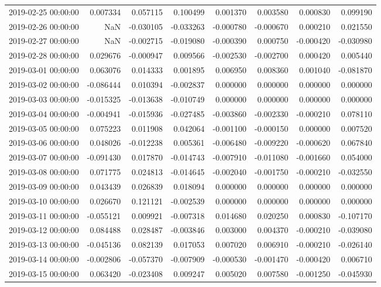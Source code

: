 \begin{tabular}{lrrrrrrr}
2019-02-25 00:00:00 & 0.007334 & 0.057115 & 0.100499 & 0.001370 & 0.003580 & 0.000830 & 0.099190 \\
2019-02-26 00:00:00 & NaN & -0.030105 & -0.033263 & -0.000780 & -0.000670 & 0.000210 & 0.021550 \\
2019-02-27 00:00:00 & NaN & -0.002715 & -0.019080 & -0.000390 & 0.000750 & -0.000420 & -0.030980 \\
2019-02-28 00:00:00 & 0.029676 & -0.000947 & 0.009566 & -0.002530 & -0.002700 & 0.000420 & 0.005440 \\
2019-03-01 00:00:00 & 0.063076 & 0.014333 & 0.001895 & 0.006950 & 0.008360 & 0.001040 & -0.081870 \\
2019-03-02 00:00:00 & -0.086444 & 0.010394 & -0.002837 & 0.000000 & 0.000000 & 0.000000 & 0.000000 \\
2019-03-03 00:00:00 & -0.015325 & -0.013638 & -0.010749 & 0.000000 & 0.000000 & 0.000000 & 0.000000 \\
2019-03-04 00:00:00 & -0.004941 & -0.015936 & -0.027485 & -0.003860 & -0.002330 & -0.000210 & 0.078110 \\
2019-03-05 00:00:00 & 0.075223 & 0.011908 & 0.042064 & -0.001100 & -0.000150 & 0.000000 & 0.007520 \\
2019-03-06 00:00:00 & 0.048026 & -0.012238 & 0.005361 & -0.006480 & -0.009220 & -0.000620 & 0.067840 \\
2019-03-07 00:00:00 & -0.091430 & 0.017870 & -0.014743 & -0.007910 & -0.011080 & -0.001660 & 0.054000 \\
2019-03-08 00:00:00 & 0.071775 & 0.024813 & -0.014645 & -0.002040 & -0.001750 & -0.000210 & -0.032550 \\
2019-03-09 00:00:00 & 0.043439 & 0.026839 & 0.018094 & 0.000000 & 0.000000 & 0.000000 & 0.000000 \\
2019-03-10 00:00:00 & 0.026670 & 0.121121 & -0.002539 & 0.000000 & 0.000000 & 0.000000 & 0.000000 \\
2019-03-11 00:00:00 & -0.055121 & 0.009921 & -0.007318 & 0.014680 & 0.020250 & 0.000830 & -0.107170 \\
2019-03-12 00:00:00 & 0.084488 & 0.028487 & -0.003846 & 0.003000 & 0.004370 & -0.000210 & -0.039080 \\
2019-03-13 00:00:00 & -0.045136 & 0.082139 & 0.017053 & 0.007020 & 0.006910 & -0.000210 & -0.026140 \\
2019-03-14 00:00:00 & -0.002806 & -0.057370 & -0.007909 & -0.000530 & -0.001470 & -0.000420 & 0.006710 \\
2019-03-15 00:00:00 & 0.063420 & -0.023408 & 0.009247 & 0.005020 & 0.007580 & -0.001250 & -0.045930 \\

\end{tabular}
